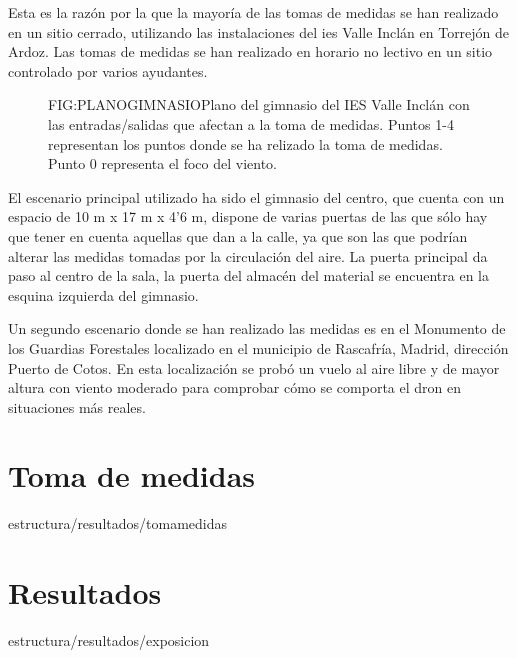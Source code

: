 Esta es la razón por la que la mayoría de las tomas de medidas se han realizado en un sitio cerrado, utilizando las instalaciones del \ac{ies} Valle Inclán en Torrejón de Ardoz. Las tomas de medidas se han realizado en horario no lectivo en un sitio controlado por varios ayudantes.

\begin{figure}[Plano gimnasio IES Valle Inclán.]{FIG:PLANOGIMNASIO}{Plano del gimnasio del IES Valle Inclán con las entradas/salidas que afectan a la toma de medidas. Puntos 1-4 representan los puntos donde se ha relizado la toma de medidas. Punto 0 representa el foco del viento.}
\end{figure}

El escenario principal utilizado ha sido el gimnasio del centro, que cuenta con un espacio de 10 m x 17 m x 4'6 m, dispone de varias puertas de las que sólo hay que tener en cuenta aquellas que dan a la calle, ya que son las que podrían alterar las medidas tomadas por la circulación del aire. La puerta principal da paso al centro de la sala, la puerta del almacén del material se encuentra en la esquina izquierda del gimnasio. 

Un segundo escenario donde se han realizado las medidas es en el Monumento de los Guardias Forestales localizado en el municipio de Rascafría, Madrid, dirección Puerto de Cotos. En esta localización se probó un vuelo al aire libre y de mayor altura con viento moderado para comprobar cómo se comporta el dron en situaciones más reales.

\section{Toma de medidas\label{SEC:TOMAMEDIDAS}}{estructura/resultados/tomamedidas}
\section{Resultados\label{SEC:EXPOSICION}}{estructura/resultados/exposicion}

